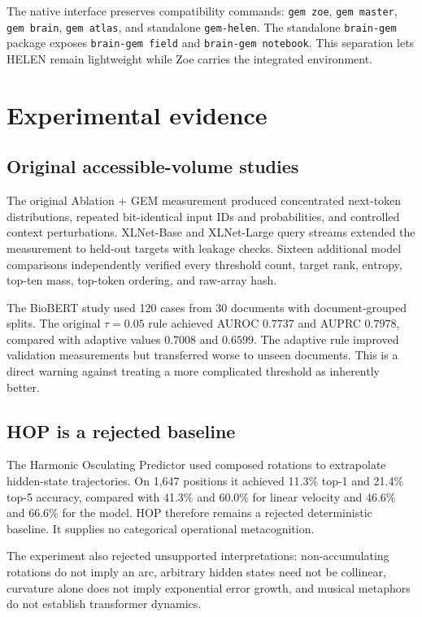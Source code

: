 \documentclass[11pt,a4paper]{article}
\begin{document}
The native interface preserves compatibility commands: \texttt{gem zoe}, \texttt{gem master}, \texttt{gem brain}, \texttt{gem atlas}, and standalone \texttt{gem-helen}. The standalone \texttt{brain-gem} package exposes \texttt{brain-gem field} and \texttt{brain-gem notebook}. This separation lets HELEN remain lightweight while Zoe carries the integrated environment.

\section{Experimental evidence}
\subsection{Original accessible-volume studies}
The original Ablation + GEM measurement produced concentrated next-token distributions, repeated bit-identical input IDs and probabilities, and controlled context perturbations. XLNet-Base and XLNet-Large query streams extended the measurement to held-out targets with leakage checks. Sixteen additional model comparisons independently verified every threshold count, target rank, entropy, top-ten mass, top-token ordering, and raw-array hash.

The BioBERT study used 120 cases from 30 documents with document-grouped splits. The original $\tau=0.05$ rule achieved AUROC $0.7737$ and AUPRC $0.7978$, compared with adaptive values $0.7008$ and $0.6599$. The adaptive rule improved validation measurements but transferred worse to unseen documents. This is a direct warning against treating a more complicated threshold as inherently better.

\subsection{HOP is a rejected baseline}
The Harmonic Osculating Predictor used composed rotations to extrapolate hidden-state trajectories. On 1,647 positions it achieved 11.3\% top-1 and 21.4\% top-5 accuracy, compared with 41.3\% and 60.0\% for linear velocity and 46.6\% and 66.6\% for the model. HOP therefore remains a rejected deterministic baseline. It supplies no categorical operational metacognition.

The experiment also rejected unsupported interpretations: non-accumulating rotations do not imply an arc, arbitrary hidden states need not be collinear, curvature alone does not imply exponential error growth, and musical metaphors do not establish transformer dynamics.
\end{document}
